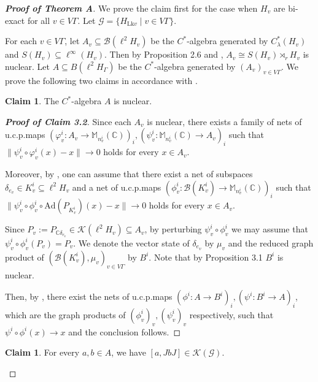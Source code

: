 \documentclass{amsart}
\theoremstyle{definition}
\newtheorem{claim}[theorem]{Claim}
\renewcommand{\subset}{\subseteq}
\newcommand{\Mat}{\mathbb{M}}
\begin{document}
\begin{proof}[\textbf{Proof of Theorem A}]
We prove the claim first for the case when $H_v$ are bi-exact for all $v\in V\Gamma$. Let $\mathcal{G}=\{ H_{\mathrm{Lk}v}\mid v\in V\Gamma\}$. 

For each $v\in V\Gamma$, let $A_v\subset \mathcal{B}(\ell^2 H_v)$ be the $C^{\ast}$-algebra generated by $C^{\ast}_{\lambda}(H_v)$ and $S(H_v)\subset \ell^{\infty}(H_v)$. Then by Proposition 2.6 and \cite[Proposition 5.1.3]{bo}, $A_v\cong S(H_v)\rtimes_r H_v$ is nuclear. Let $A\subset B(\ell^2 H_{\Gamma})$ be the $C^{\ast}$-algebra generated by $(A_v)_{v\in V\Gamma}$. 
We prove the following two claims in accordance with \cite[Lemma 2.4]{oza2}. 

\begin{claim}
The $C^{\ast}$-algebra $A$ is nuclear. 
\end{claim}

\begin{proof}[\textbf{Proof of Claim 3.2}]
Since each $A_v$ is nuclear, there exists a family of nets of u.c.p.\@ maps $(\varphi_v^i:A_v\to \Mat_{n_v^i}(\mathbb{C}) )_i, (\psi_v^i: \Mat_{n_v^i}(\mathbb{C})\to A_v)_i$ 
such that $\|\psi_v^i\circ \varphi_v^i(x) - x\|\to 0$ holds for every $x\in A_v$.  

Moreover, by \cite[Lemma 4.1]{dp}, one can assume that there exist a net of subspaces $\delta_{e_v}\in K_v^i\subset \ell^2 H_v$ and a net of u.c.p.\@ maps $(\phi_v^i:\mathcal{B}(K_v^i)\to \Mat_{n_v^i}(\mathbb{C}) )_i$ such that $\|\psi_v^i\circ \phi_v^i\circ \mathrm{Ad}(P_{K_v^i})(x) - x\|\to 0$ holds for every $x\in A_v$. 

Since $P_v:=P_{\mathbb{C}\delta_{e_v}}\in \mathcal{K}(\ell^2 H_v) \subset A_v$, by perturbing $\psi_v^i\circ\phi_v^i$ we may assume that $\psi_v^i\circ\phi_v^i(P_v)=P_v$. 
We denote the vector state of $\delta_{e_v}$ by $\mu_v$ and the reduced graph product of $(\mathcal{B}(K_v^i), \mu_v)_{v\in V\Gamma}$ by $B^i$. Note that by Proposition 3.1 $B^i$ is nuclear. 

Then, by \cite[Corollary 4.1]{atk}, there exist the nets of u.c.p.\@ maps
$(\phi^i:A\to B^i )_i, (\psi^i: B^i \to A)_i$, which are the graph products of $(\phi_v^i)_v, (\psi_v^i)_v$ respectively, such that $\psi^i\circ \phi^i(x)\to x$ and the conclusion follows. 
\end{proof}

\begin{claim}
For every $a,b\in A$, we have $[a, JbJ]\in \mathcal{K}(\mathcal{G})$. 
\end{claim}


\end{proof}
\end{document}

